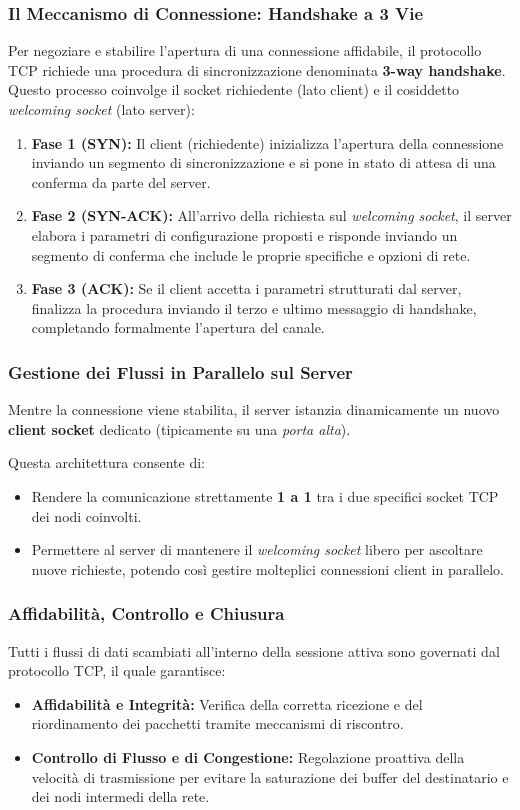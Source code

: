 \documentclass[11pt,a4paper]{report}
\begin{document}
\subsubsection{Il Meccanismo di Connessione: Handshake a 3 Vie}
Per negoziare e stabilire l'apertura di una connessione affidabile, il protocollo TCP richiede una procedura di sincronizzazione denominata \textbf{3-way handshake}. Questo processo coinvolge il socket richiedente (lato client) e il cosiddetto \textit{welcoming socket} (lato server):

\begin{enumerate}
    \item \textbf{Fase 1 (SYN):} Il client (richiedente) inizializza l'apertura della connessione inviando un segmento di sincronizzazione e si pone in stato di attesa di una conferma da parte del server.
    \item \textbf{Fase 2 (SYN-ACK):} All'arrivo della richiesta sul \textit{welcoming socket}, il server elabora i parametri di configurazione proposti e risponde inviando un segmento di conferma che include le proprie specifiche e opzioni di rete.
    \item \textbf{Fase 3 (ACK):} Se il client accetta i parametri strutturati dal server, finalizza la procedura inviando il terzo e ultimo messaggio di handshake, completando formalmente l'apertura del canale.
\end{enumerate}

\subsubsection{Gestione dei Flussi in Parallelo sul Server}
Mentre la connessione viene stabilita, il server istanzia dinamicamente un nuovo \textbf{client socket} dedicato (tipicamente su una \textit{porta alta}). 

Questa architettura consente di:
\begin{itemize}
    \item Rendere la comunicazione strettamente \textbf{1 a 1} tra i due specifici socket TCP dei nodi coinvolti.
    \item Permettere al server di mantenere il \textit{welcoming socket} libero per ascoltare nuove richieste, potendo così gestire molteplici connessioni client in parallelo.
\end{itemize}

\subsubsection{Affidabilità, Controllo e Chiusura}
Tutti i flussi di dati scambiati all'interno della sessione attiva sono governati dal protocollo TCP, il quale garantisce:
\begin{itemize}
    \item \textbf{Affidabilità e Integrità:} Verifica della corretta ricezione e del riordinamento dei pacchetti tramite meccanismi di riscontro.
    \item \textbf{Controllo di Flusso e di Congestione:} Regolazione proattiva della velocità di trasmissione per evitare la saturazione dei buffer del destinatario e dei nodi intermedi della rete.
\end{itemize}
\end{document}
